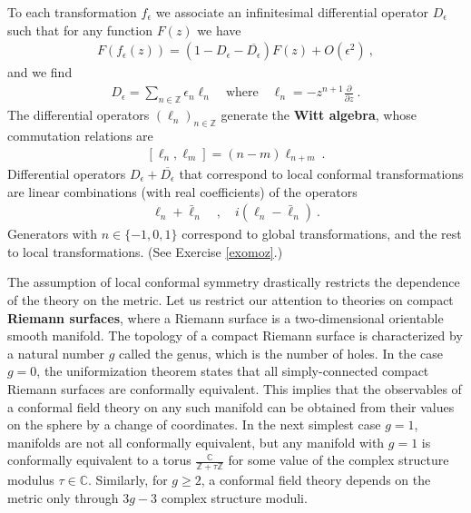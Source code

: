 \documentclass[12pt, a4paper, notitlepage, twoside]{report}
\numberwithin{equation}{section}
\theoremstyle{break}
\begin{document}
To each transformation $f_\epsilon$ we associate an infinitesimal differential operator $D_\epsilon$ such that for any function $F(z)$ we have 
\begin{align}
 F(f_\epsilon(z)) = \left(1- D_\epsilon -\overline{D_\epsilon} \right)F(z) + O(\epsilon^2)\ ,
\label{ffe}
\end{align}
and we find
\begin{align}
 D_\epsilon = \sum_{n\in {\mathbb{Z}}} \epsilon_n\ell_n  \quad \text{where} \quad \boxed{\ell_n= -z^{n+1}{\frac{\partial}{\partial z}}} \ .
\label{elln}
\end{align}
The differential operators $(\ell_n)_{n\in {\mathbb{Z}}}$ generate the \textbf{\boldmath Witt algebra}, whose commutation relations are
\begin{align}
 \boxed{[\ell_n,\ell_m]=(n-m)\ell_{n+m}}\ .
\end{align}
Differential operators $D_\epsilon +\overline{D_\epsilon}$ that correspond to local conformal transformations are linear combinations (with real coefficients) of the operators
\begin{align}
 \ell_n + \bar\ell_n \quad , \quad i(\ell_n-\bar\ell_n) \ .
 \label{ilml}
\end{align}
Generators with $n\in\{-1,0,1\}$ correspond to global transformations, and the rest to local transformations. (See Exercise \ref{exomoz}.) 

The assumption of local conformal symmetry drastically restricts the dependence of the theory on the metric.
Let us restrict our attention to theories on compact \textbf{\boldmath Riemann surfaces}, where a Riemann surface is a two-dimensional orientable smooth manifold.
The topology of a compact Riemann surface is characterized by a natural number $g$ called the genus, which is the number of holes.
In the case $g=0$, the uniformization theorem states that all simply-connected compact Riemann surfaces are conformally equivalent. 
This implies that the observables of a conformal field theory on any such manifold can be obtained from their values on the sphere by a change of coordinates.
In the next simplest case $g=1$, manifolds are not all conformally equivalent, but any manifold with $g=1$ is conformally equivalent to a torus $\frac{{\mathbb{C}}}{{\mathbb{Z}}+\tau{\mathbb{Z}}}$ for some value of the
complex structure modulus $\tau \in {\mathbb{C}}$.
Similarly, for $g\geq 2$, a conformal field theory depends on the metric only through $3g-3$ complex structure moduli. 
\end{document}
